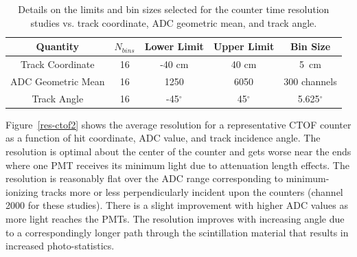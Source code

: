\documentclass{elsart}
\begin{document}
\begin{table}[htpb]
\begin{center}
\begin{tabular} {|c|c|c|c|c|} \hline
Quantity           & $N_{bins}$ & Lower Limit & Upper Limit & Bin Size \\ \hline
Track Coordinate   & 16 & -40 cm      & 40 cm      & 5~cm \\ \hline
ADC Geometric Mean & 16 & 1250        & 6050       & 300 channels \\ \hline
Track Angle        & 16 & -45$^\circ$ & 45$^\circ$ & 5.625$^\circ$ \\ \hline
\end{tabular}
\end{center}
\caption{Details on the limits and bin sizes selected for the counter time resolution studies vs.
track coordinate, ADC geometric mean, and track angle.}
\label{res-studies}
\end{table}

Figure~\ref{res-ctof2} shows the average resolution for a representative CTOF counter as a function
of hit coordinate, ADC value, and track incidence angle. The resolution is optimal about the center of
the counter and gets worse near the ends where one PMT receives its minimum light due to attenuation
length effects. The resolution is reasonably flat over the ADC range corresponding to minimum-ionizing
tracks more or less perpendicularly incident upon the counters (channel 2000 for these studies). There
is a slight improvement with higher ADC values as more light reaches the PMTs. The resolution improves
with increasing angle due to a correspondingly longer path through the scintillation material that results in
increased photo-statistics.
\end{document}
